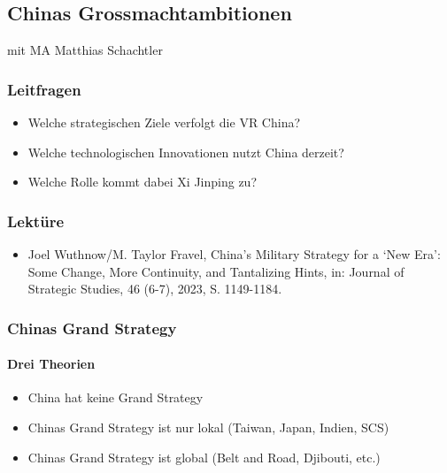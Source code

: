 {}\documentclass[a4paper]{article}
\providecommand{\tightlist}{\setlength{\itemsep}{1mm}\setlength{\parskip}{1mm}}
\begin{document}
\subsection{Chinas
	Grossmachtambitionen}\label{chinas-grossmachtambitionen}

mit MA Matthias Schachtler

\subsubsection{Leitfragen}\label{leitfragen-12}

\begin{itemize}
	\tightlist
	\item
	      Welche strategischen Ziele verfolgt die VR China?
	\item
	      Welche technologischen Innovationen nutzt China derzeit?
	\item
	      Welche Rolle kommt dabei Xi Jinping zu?
\end{itemize}

\subsubsection{Lektüre}\label{lektuxfcre-12}

\begin{itemize}
	\tightlist
	\item
	      Joel Wuthnow/M. Taylor Fravel, China's Military Strategy for a `New
	      Era': Some Change, More Continuity, and Tantalizing Hints, in: Journal
	      of Strategic Studies, 46 (6-7), 2023, S. 1149-1184.
\end{itemize}

\subsubsection{Chinas Grand Strategy}\label{chinas-grand-strategy}

\paragraph{Drei Theorien}\label{drei-theorien}

\begin{itemize}
	\tightlist
	\item
	      China hat keine Grand Strategy
	\item
	      Chinas Grand Strategy ist nur lokal (Taiwan, Japan, Indien, SCS)
	\item
	      Chinas Grand Strategy ist global (Belt and Road, Djibouti, etc.)
\end{itemize}
\end{document}
